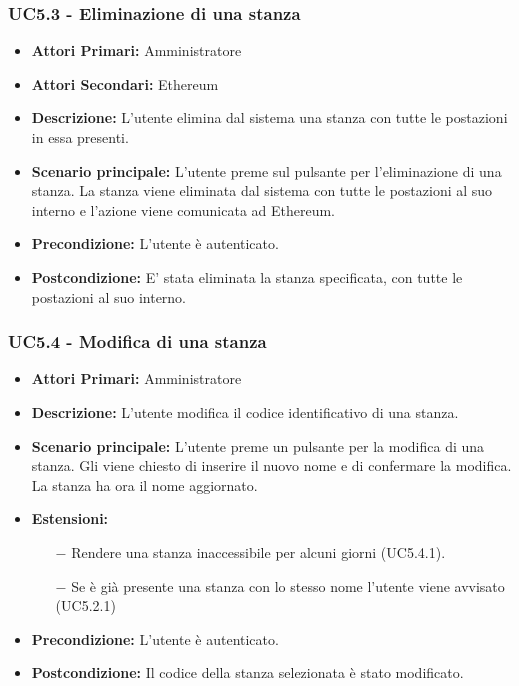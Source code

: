 \subsubsection{ UC5.3 - Eliminazione di una stanza}
\begin{itemize}
	\item\textbf{Attori Primari:}
	Amministratore 
	\item\textbf{Attori Secondari:}
	Ethereum
	\item\textbf{Descrizione:} 
	L'utente elimina dal sistema una stanza con tutte le postazioni in essa presenti.
	\item\textbf{Scenario principale:} 
	L'utente preme sul pulsante per l'eliminazione di una stanza. La stanza viene eliminata dal sistema con tutte le postazioni al suo interno e l'azione viene comunicata ad Ethereum.
	\item\textbf{Precondizione:} 
	L'utente è autenticato.
	\item\textbf{Postcondizione:}
	E' stata eliminata la stanza specificata, con tutte le postazioni al suo interno.
\end{itemize}

\subsubsection{ UC5.4 - Modifica di una stanza}
\begin{itemize}
	\item\textbf{Attori Primari:}
	Amministratore 
	\item\textbf{Descrizione:}
	L'utente modifica il codice identificativo di una stanza.
	\item\textbf{Scenario principale:} 
	L'utente preme un pulsante per la modifica di una stanza. Gli viene chiesto di inserire il nuovo nome e di confermare la modifica. La stanza ha ora il nome aggiornato.
	\item\textbf{Estensioni:}
	\begin{itemize}
		\item[$-$] Rendere una stanza inaccessibile per alcuni giorni (UC5.4.1).
		\item[$-$] Se è già presente una stanza con lo stesso nome l'utente viene avvisato (UC5.2.1)
	\end{itemize}

	\item\textbf{Precondizione:} 
	L'utente è autenticato.
	\item\textbf{Postcondizione:}
	Il codice della stanza selezionata è stato modificato.
\end{itemize}

